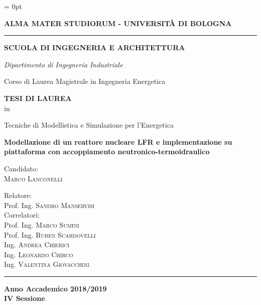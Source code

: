 \begin{titlepage}
\noindent
\centering
\marginparwidth=0pt
\marginparsep= 0pt

{\large \textbf{ALMA MATER STUDIORUM - UNIVERSIT\`A DI BOLOGNA }}

\rule[1mm]{\textwidth}{0.1mm}
{\normalsize \textbf{SCUOLA DI INGEGNERIA E ARCHITETTURA}}

{\normalsize \textit{Dipartimento di Ingegneria Industriale}}

{\normalsize Corso di Laurea Magistrale in Ingegneria Energetica
	}

{\normalsize
\textbf{TESI DI LAUREA} \\ in}

{\normalsize {Tecniche di Modellistica e Simulazione per l'Energetica}}



{\large{\textbf{Modellazione di un reattore nucleare LFR e implementazione su piattaforma con accoppiamento neutronico-termoidraulico}}}




\null\hfill
\begin{minipage}[t]{0.45\textwidth}\raggedright
Candidato:\\
\vspace{0.2mm}
\textsc{\small {Marco Lanconelli}} 
\end{minipage}
\hfill
\begin{minipage}[t]{0.45\textwidth}\raggedleft
Relatore:\\
\vspace{0.1mm}
 \small{Prof. Ing. \textsc{Sandro Manservisi}} \\
 \vspace{4mm}
\vspace{0.1mm}
\normalsize {Correlatori:}\\
\vspace{1mm}
{\small 
Prof. Ing. \textsc{Marco Sumini}\\
Prof. Ing. \textsc{Ruben Scardovelli}\\
Ing. \textsc{Andrea Chierici}\\
Ing. \textsc{Leonardo Chirco}\\
Ing. \textsc{Valentina Giovacchini}\\
\vspace{2mm}
\vspace{0.1mm}
}

\end{minipage}
\hfill\null
{}



\rule[1mm]{\textwidth}{0.1mm}
{\normalsize \textbf{Anno Accademico 2018/2019}} \\
{\normalsize \textbf{IV Sessione}}

\end{titlepage}
